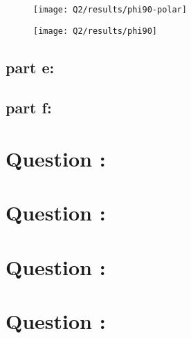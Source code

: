\documentclass[12pt,onecolumn,a4paper]{article}
\newcommand\question{\section{Question \numberstringnum{\thesection}:}}
\begin{document}
	
	
	\begin{figure}[h]
		\centering
		\texttt{[image: Q2/results/phi90-polar]}
		\caption{}
		\label{fig:phi90-polar}
	\end{figure}
	
	
	\begin{figure}[h]
		\centering
		\texttt{[image: Q2/results/phi90]}
		\caption{}
		\label{fig:phi90}
	\end{figure}
	
	
	
	\FloatBarrier
	\subsection{part e:}
	
	
	
	
	\FloatBarrier
	\subsection{part f:}
	
	
	\FloatBarrier
	\question%
	
	
	
	
	
	\FloatBarrier
	\question%
	
	
	
	
	
	
	\FloatBarrier
	\question%
	


	
	
	\FloatBarrier
	\question%


	
	
	\newpage
	
	
	
\end{document}
